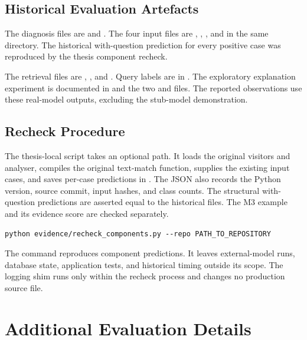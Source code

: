 \section{Historical Evaluation Artefacts}
The diagnosis files are  and . The four input files are , , , and  in the same directory. The historical with-question prediction for every positive case was reproduced by the thesis component recheck.

The retrieval files are , , and . Query labels are in . The exploratory explanation experiment is documented in  and the two  and  files. The reported observations use these real-model outputs, excluding the stub-model demonstration.

\section{Recheck Procedure}
The thesis-local  script takes an optional  path. It loads the original visitors and analyser, compiles the original text-match function, supplies the existing input cases, and saves per-case predictions in . The JSON also records the Python version, source commit, input hashes, and class counts. The structural with-question predictions are asserted equal to the historical files. The M3 example and its evidence score are checked separately.

\begin{lstlisting}
python evidence/recheck_components.py --repo PATH_TO_REPOSITORY
\end{lstlisting}
The command reproduces component predictions. It leaves external-model runs, database state, application tests, and historical timing outside its scope. The logging shim runs only within the recheck process and changes no production source file.

\chapter{Additional Evaluation Details}
